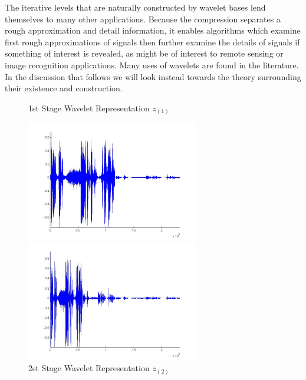 \documentclass{report}
\begin{document}
The iterative levels that are naturally constructed by wavelet bases lend themselves to many other applications. Because the compression separates a rough approximation and detail information, it enables algorithms which examine first rough approximations of signals then further examine the details of signals if something of interest is revealed, as might be of interest to remote sensing or image recognition applications.
Many uses of wavelets are found in the literature. In the discussion that follows we will look instead towards the theory surrounding their existence and construction.


\begin{figure}[!hb]
\center
\caption{1st Stage Wavelet Representation $z_{(1)}$}
\label{fig:stage1}
\includegraphics[height=5.25cm]{stage1}

\caption{2st Stage Wavelet Representation $z_{(2)}$}
\label{fig:stage2}
\includegraphics[height=5.25cm]{stage2}
\end{figure}
\end{document}
